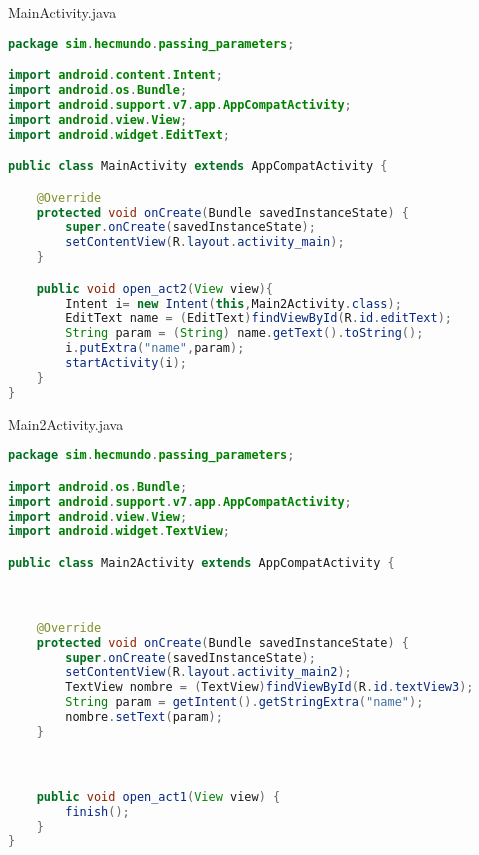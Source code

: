\documentclass{report}
\begin{document}

MainActivity.java
\begin{lstlisting}[language=java]
package sim.hecmundo.passing_parameters;

import android.content.Intent;
import android.os.Bundle;
import android.support.v7.app.AppCompatActivity;
import android.view.View;
import android.widget.EditText;

public class MainActivity extends AppCompatActivity {

    @Override
    protected void onCreate(Bundle savedInstanceState) {
        super.onCreate(savedInstanceState);
        setContentView(R.layout.activity_main);
    }

    public void open_act2(View view){
        Intent i= new Intent(this,Main2Activity.class);
        EditText name = (EditText)findViewById(R.id.editText);
        String param = (String) name.getText().toString();
        i.putExtra("name",param);
        startActivity(i);
    }
}
\end{lstlisting}	

Main2Activity.java
\begin{lstlisting}[language=java]
package sim.hecmundo.passing_parameters;

import android.os.Bundle;
import android.support.v7.app.AppCompatActivity;
import android.view.View;
import android.widget.TextView;

public class Main2Activity extends AppCompatActivity {



    @Override
    protected void onCreate(Bundle savedInstanceState) {
        super.onCreate(savedInstanceState);
        setContentView(R.layout.activity_main2);
        TextView nombre = (TextView)findViewById(R.id.textView3);
        String param = getIntent().getStringExtra("name");
        nombre.setText(param);
    }



    public void open_act1(View view) {
        finish();
    }
}
\end{lstlisting}
\end{document}
